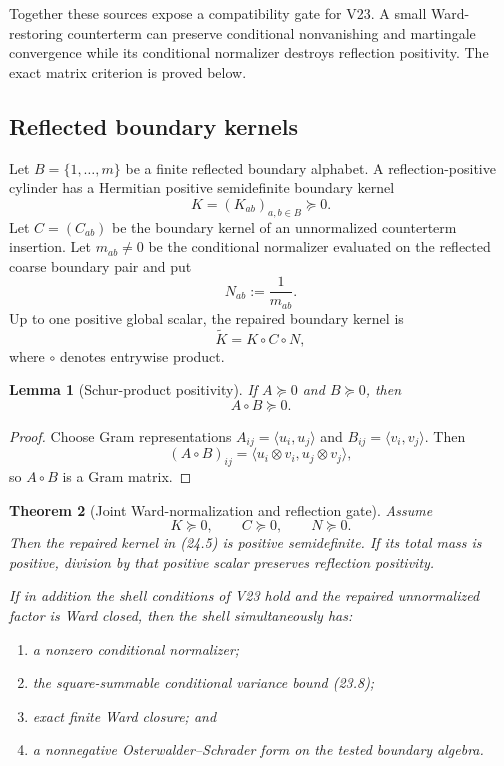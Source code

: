 \documentclass[11pt]{article}
\newtheorem{theorem}{Theorem}[section]
\newtheorem{lemma}[theorem]{Lemma}
\theoremstyle{remark}
\begin{document}
Together these sources expose a compatibility gate for V23.  A
small Ward-restoring counterterm can preserve conditional
nonvanishing and martingale convergence while its conditional
normalizer destroys reflection positivity.  The exact matrix
criterion is proved below.

\subsection{Reflected boundary kernels}

Let \(B=\{1,\ldots,m\}\) be a finite reflected boundary alphabet.
A reflection-positive cylinder has a Hermitian positive semidefinite
boundary kernel
\[
                         K=(K_{ab})_{a,b\in B}\succeq0.      \tag{24.3}
\]
Let \(C=(C_{ab})\) be the boundary kernel of an unnormalized
counterterm insertion.  Let \(m_{ab}\ne0\) be the conditional
normalizer evaluated on the reflected coarse boundary pair and put
\[
                         N_{ab}:=\frac1{m_{ab}}.             \tag{24.4}
\]
Up to one positive global scalar, the repaired boundary kernel is
\[
                         \widetilde K=K\circ C\circ N,       \tag{24.5}
\]
where \(\circ\) denotes entrywise product.

\begin{lemma}[Schur-product positivity]
\label{lem:v12v24-Schur}
If \(A\succeq0\) and \(B\succeq0\), then
\[
                         A\circ B\succeq0.                  \tag{24.6}
\]
\end{lemma}

\begin{proof}
Choose Gram representations
\(A_{ij}=\langle u_i,u_j\rangle\) and
\(B_{ij}=\langle v_i,v_j\rangle\).  Then
\[
 (A\circ B)_{ij}
 =
 \langle u_i\otimes v_i,u_j\otimes v_j\rangle,
\]
so \(A\circ B\) is a Gram matrix.
\end{proof}

\begin{theorem}[Joint Ward-normalization and reflection gate]
\label{thm:v12v24-joint}
Assume
\[
                         K\succeq0,\qquad C\succeq0,\qquad
                         N\succeq0.                         \tag{24.7}
\]
Then the repaired kernel in (24.5) is positive semidefinite.  If its
total mass is positive, division by that positive scalar preserves
reflection positivity.

If in addition the shell conditions of V23 hold and the repaired
unnormalized factor is Ward closed, then the shell simultaneously
has:
\begin{enumerate}
\item a nonzero conditional normalizer;
\item the square-summable conditional variance bound (23.8);
\item exact finite Ward closure; and
\item a nonnegative Osterwalder--Schrader form on the tested boundary
      algebra.
\end{enumerate}
\end{theorem}
\end{document}
